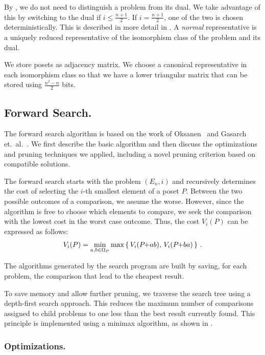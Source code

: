 \documentclass[a4paper,UKenglish,cleveref, autoref, thm-restate]{lipics-v2021}
\newcommand{\pchild}[3]{{#1}\kern-1pt{+}{#2}{#3}}
\begin{document}
By , we do not need to distinguish a problem from its dual.
We take advantage of this by switching to the dual if $i \leq \frac{n+1}{2}$.
If $i = \frac{n+1}{2}$, one of the two is chosen deterministically.
This is described in more detail in .
A \emph{normal} representative is a uniquely reduced representative of the isomorphism class of the problem and its dual.

We store posets as adjacency matrix.
We choose a canonical representative in each isomorphism class so that we have a lower triangular matrix that can be stored using $\frac{n^2 - n}{2}$ bits.


\subsection{Forward Search.} \label{chapter:forward_search}
The forward search algorithm is based on the work of Oksanen~\cite{Oksanen2006} and Gasarch et.\ al\@.~\cite{Gasarch1996}.
We first describe the basic algorithm and then discuss the optimizations and pruning techniques we applied, including a novel pruning criterion based on compatible solutions.

The forward search starts with the problem $(E_n, i)$ and recursively determines the cost of selecting the $i$-th smallest element of a poset $P$.
Between the two possible outcomes of a comparison, we assume the worse.
However, since the algorithm is free to choose which elements to compare, we seek the comparison with the lowest cost in the worst case outcome.
Thus, the cost $V_i(P)$ can be expressed as follows:
\begin{equation}
  V_i(P) = \min_{a,b \in \Omega_P} \max \left\{ \,V_i(\pchild{P}{a}{b}),\, V_i(\pchild{P}{b}{a})\,\right\}\,\text{.}
\end{equation}

The algorithms generated by the search program are built by saving, for each problem, the comparison that lead to the cheapest result.

To save memory and allow further pruning, we traverse the search tree using a depth-first search approach.
This reduces the maximum number of comparisons assigned to child problems to one less than the best result currently found.
This principle is implemented using a minimax algorithm, as shown in .


\subsubsection{Optimizations.}
\end{document}
